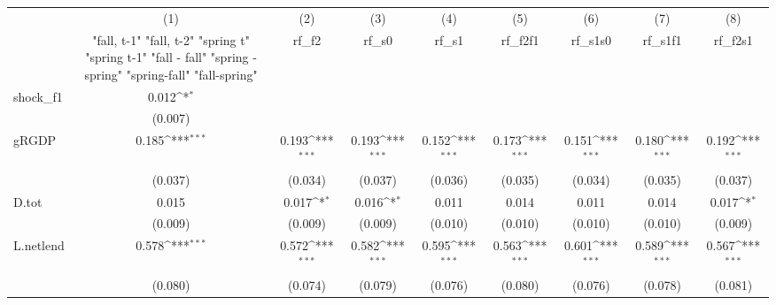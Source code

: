 {
\def\sym#1{\ifmmode^{#1}\else\(^{#1}\)\fi}
\begin{tabular}{l*{8}{c}}
\toprule
            &\multicolumn{1}{c}{(1)}&\multicolumn{1}{c}{(2)}&\multicolumn{1}{c}{(3)}&\multicolumn{1}{c}{(4)}&\multicolumn{1}{c}{(5)}&\multicolumn{1}{c}{(6)}&\multicolumn{1}{c}{(7)}&\multicolumn{1}{c}{(8)}\\
            &\multicolumn{1}{c}{  "fall, t-1" "fall, t-2" "spring t" "spring t-1"  "fall - fall" "spring - spring" "spring-fall" "fall-spring" }&\multicolumn{1}{c}{rf\_f2}&\multicolumn{1}{c}{rf\_s0}&\multicolumn{1}{c}{rf\_s1}&\multicolumn{1}{c}{rf\_f2f1}&\multicolumn{1}{c}{rf\_s1s0}&\multicolumn{1}{c}{rf\_s1f1}&\multicolumn{1}{c}{rf\_f2s1}\\
\midrule
shock\_f1    &       0.012\sym{*}  &                     &                     &                     &                     &                     &                     &                     \\
            &     (0.007)         &                     &                     &                     &                     &                     &                     &                     \\
\addlinespace
gRGDP       &       0.185\sym{***}&       0.193\sym{***}&       0.193\sym{***}&       0.152\sym{***}&       0.173\sym{***}&       0.151\sym{***}&       0.180\sym{***}&       0.192\sym{***}\\
            &     (0.037)         &     (0.034)         &     (0.037)         &     (0.036)         &     (0.035)         &     (0.034)         &     (0.035)         &     (0.037)         \\
\addlinespace
D.tot       &       0.015         &       0.017\sym{*}  &       0.016\sym{*}  &       0.011         &       0.014         &       0.011         &       0.014         &       0.017\sym{*}  \\
            &     (0.009)         &     (0.009)         &     (0.009)         &     (0.010)         &     (0.010)         &     (0.010)         &     (0.010)         &     (0.009)         \\
\addlinespace
L.netlend   &       0.578\sym{***}&       0.572\sym{***}&       0.582\sym{***}&       0.595\sym{***}&       0.563\sym{***}&       0.601\sym{***}&       0.589\sym{***}&       0.567\sym{***}\\
            &     (0.080)         &     (0.074)         &     (0.079)         &     (0.076)         &     (0.080)         &     (0.076)         &     (0.078)         &     (0.081)         \\

\end{tabular}}
